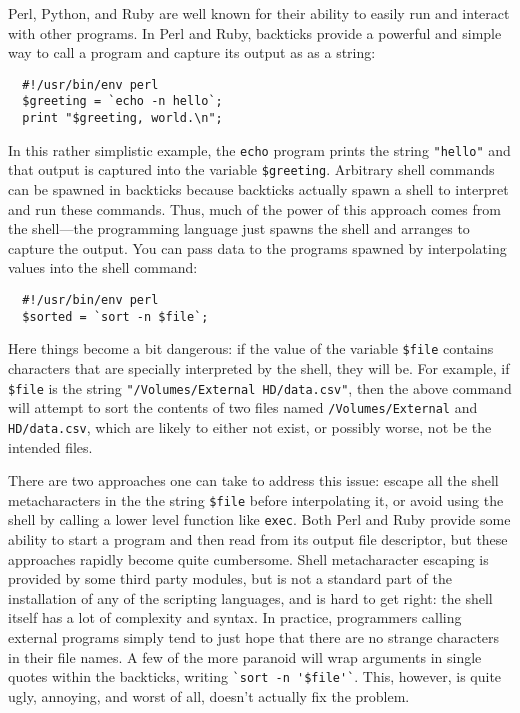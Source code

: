 \documentclass{article}
\begin{document}
Perl, Python, and Ruby are well known for their ability to easily run and interact with other programs.
In Perl and Ruby, backticks provide a powerful and simple way to call a program and capture its output as as a string:
\begin{verbatim}
  #!/usr/bin/env perl
  $greeting = `echo -n hello`;
  print "$greeting, world.\n";
\end{verbatim}
In this rather simplistic example, the \verb|echo| program prints the string \verb|"hello"| and that output is captured into the variable \verb|$greeting|.
Arbitrary shell commands can be spawned in backticks because backticks actually spawn a shell to interpret and run these commands.
Thus, much of the power of this approach comes from the shell---the programming language just spawns the shell and arranges to capture the output.
You can pass data to the programs spawned by interpolating values into the shell command:
\begin{verbatim}
  #!/usr/bin/env perl
  $sorted = `sort -n $file`;
\end{verbatim}
Here things become a bit dangerous:
if the value of the variable \verb|$file| contains characters that are specially interpreted by the shell, they will be.
For example, if \verb|$file| is the string \verb|"/Volumes/External HD/data.csv"|, then the above command will attempt to sort the contents of two files named \verb|/Volumes/External| and \verb|HD/data.csv|, which are likely to either not exist, or possibly worse, not be the intended files.

There are two approaches one can take to address this issue: escape all the shell metacharacters in the the string \verb|$file| before interpolating it, or avoid using the shell by calling a lower level function like \verb|exec|.
Both Perl and Ruby provide some ability to start a program and then read from its output file descriptor, but these approaches rapidly become quite cumbersome.
Shell metacharacter escaping is provided by some third party modules, but is not a standard part of the installation of any of the scripting languages, and is hard to get right:
the shell itself has a lot of complexity and syntax.
In practice, programmers calling external programs simply tend to just hope that there are no strange characters in their file names.
A few of the more paranoid will wrap arguments in single quotes within the backticks, writing \verb|`sort -n '$file'`|.
This, however, is quite ugly, annoying, and worst of all, doesn't actually fix the problem.
\end{document}
